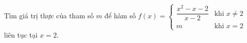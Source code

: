 \begin{ex}
Tìm giá trị thực của tham số $m$ để hàm số $f(x)=\begin{cases}\dfrac{x^2-x-2}{x-2}&\text{khi }x\ne2\\m&\text{khi }x=2\end{cases}$ liên tục tại $x=2$.
\end{ex}
